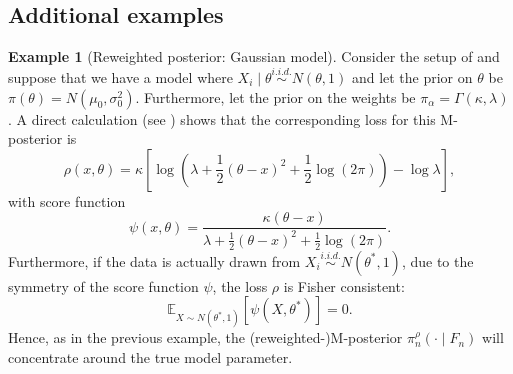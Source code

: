 \documentclass[11pt, oneside]{amsart}
\theoremstyle{definition}   %
\newtheorem{example}{Example}
\newcommand{\E}{\mathbb{E}}
\newcommand{\loss}{\rho}
\newcommand{\mposterior}{\pi_n^{\loss}}
\begin{document}
\subsection{Additional examples} \label{asec::additional-examples}
\begin{example}[Reweighted posterior: Gaussian model]
\label{example:gamma_weights}
    Consider the setup of  and suppose that we have a model where \( X_i \mid \theta \overset{i.i.d.}{\sim} N(\theta, 1) \) and let the prior on \( \theta \) be \( \pi(\theta) = N(\mu_0,\sigma_0^2) \).
    Furthermore, let the prior on the weights be \( \pi_\alpha = \Gamma(\kappa, \lambda) \).
    A direct calculation (see ) shows that the corresponding loss for this M-posterior is
    \[
        \loss(x, \theta) = \kappa \left [ \log \left ( \lambda + \frac{1}{2}(\theta-x)^2 + \frac{1}{2}\log(2\pi) \right ) - \log \lambda \right ],
    \]
    with score function
    \[
        \psi(x, \theta) = \frac{\kappa(\theta - x)}{\lambda + \frac{1}{2} (\theta - x)^2 + \frac{1}{2}\log(2\pi)}.
    \]
    Furthermore, if the data is actually drawn from \( X_i \overset{i.i.d.}{\sim} N(\theta^*, 1) \), due to the symmetry of the score function \( \psi \), the loss \( \loss \) is Fisher consistent:
    \[
        \E_{X \sim N(\theta^*, 1)} [ \psi(X, \theta^*)  ] = 0.
    \]
    Hence, as in the previous example, the (reweighted-)M-posterior \( \mposterior(\cdot \mid F_n)\) will concentrate around the true model parameter.
\end{example}
%
\end{document}
